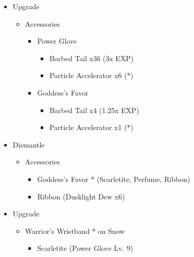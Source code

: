 \begin{upgrade}
\begin{itemize}
    \item Upgrade
    \begin{itemize}
        \item Accessories
        \begin{itemize}
            \item Power Glove
            \begin{itemize}
                \item Barbed Tail x36 (3x EXP)
                \item Particle Accelerator x6 (*)
            \end{itemize}
            \item Goddess's Favor
            \begin{itemize}
                \item Barbed Tail x4 (1.25x EXP)
                \item Particle Accelerator x1 (*)
            \end{itemize}
        \end{itemize}
    \end{itemize}
    \item Dismantle
    \begin{itemize}
        \item Accessories
        \begin{itemize}
            \item Goddess's Favor * (Scarletite, Perfume, Ribbon)
            \item Ribbon (Dusklight Dew x6)
        \end{itemize}
    \end{itemize}
    \item Upgrade
    \begin{itemize}
        \item Warrior's Wristband * on Snow
        \begin{itemize}
            \item Scarletite (Power Glove Lv. 9)
        \end{itemize}
    \end{itemize}
\end{itemize}
\end{upgrade}
